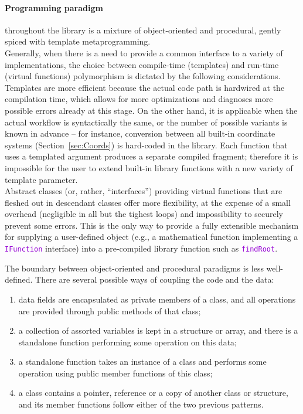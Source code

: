 \documentclass[12pt]{article}
\newcommand{\ttt}[1]{\textcolor{darkviolet}{\texttt{#1}}}
\let\oldparagraph\paragraph
\renewcommand{\paragraph}[1]{\vspace{-2mm}\oldparagraph{#1}}
\begin{document}
\paragraph{Programming paradigm} throughout the library is a mixture of object-oriented and procedural, gently spiced with template metaprogramming.\\
Generally, when there is a need to provide a common interface to a variety of implementations, the choice between compile-time (templates) and run-time (virtual functions) polymorphism is dictated by the following considerations.\\
Templates are more efficient because the actual code path is hardwired at the compilation time, which allows for more optimizations and diagnoses more possible errors already at this stage. On the other hand, it is applicable when the actual workflow is syntactically the same, or the number of possible variants is known in advance -- for instance, conversion between all built-in coordinate systems (Section~\ref{sec:Coords}) is hard-coded in the library. Each function that uses a templated argument produces a separate compiled fragment; therefore it is impossible for the user to extend built-in library functions with a new variety of template parameter.\\
Abstract classes (or, rather, ``interfaces'') providing virtual functions that are fleshed out in descendant classes offer more flexibility, at the expense of a small overhead (negligible in all but the tighest loops) and impossibility to securely prevent some errors. This is the only way to provide a fully extensible mechanism for supplying a user-defined object (e.g., a mathematical function implementing a \ttt{IFunction} interface) into a pre-compiled library function such as \ttt{findRoot}.

The boundary between object-oriented and procedural paradigms is less well-defined. There are several possible ways of coupling the code and the data:
\begin{enumerate} \setlength{\parskip}{2pt} \setlength{\itemsep}{2pt}
\item data fields are encapsulated as private members of a class, and all operations are provided through public methods of that class;
\item a collection of assorted variables is kept in a structure or array, and there is a standalone function performing some operation on this data;
\item a standalone function takes an instance of a class and performs some operation using public member functions of this class;
\item a class contains a pointer, reference or a copy of another class or structure, and its member functions follow either of the two previous patterns.
\end{enumerate}
\end{document}
